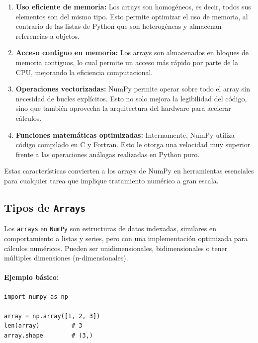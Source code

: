 \documentclass{article}
\theoremstyle{nonumberplain}
\begin{document}
\begin{enumerate}
  \item \textbf{Uso eficiente de memoria:} Los arrays son homogéneos, es decir, todos sus elementos son del mismo tipo. Esto permite optimizar el uso de memoria, al contrario de las listas de Python que son heterogéneas y almacenan referencias a objetos.
  
  \item \textbf{Acceso contiguo en memoria:} Los arrays son almacenados en bloques de memoria contiguos, lo cual permite un acceso más rápido por parte de la CPU, mejorando la eficiencia computacional.
  
  \item \textbf{Operaciones vectorizadas:} NumPy permite operar sobre todo el array sin necesidad de bucles explícitos. Esto no solo mejora la legibilidad del código, sino que también aprovecha la arquitectura del hardware para acelerar cálculos.
  
  \item \textbf{Funciones matemáticas optimizadas:} Internamente, NumPy utiliza código compilado en C y Fortran. Esto le otorga una velocidad muy superior frente a las operaciones análogas realizadas en Python puro.
\end{enumerate}

Estas características convierten a los arrays de NumPy en herramientas esenciales para cualquier tarea que implique tratamiento numérico a gran escala.

\subsection*{Tipos de \texttt{Arrays}}

Los \texttt{arrays} en \texttt{NumPy} son estructuras de datos indexadas, similares en comportamiento a listas y series, pero con una implementación optimizada para cálculos numéricos. Pueden ser unidimensionales, bidimensionales o tener múltiples dimensiones (n-dimensionales).

\paragraph{Ejemplo básico:}

\begin{verbatim}
import numpy as np

array = np.array([1, 2, 3])
len(array)         # 3
array.shape        # (3,)
\end{verbatim}
\end{document}
